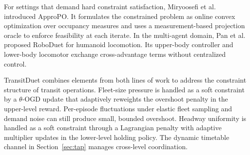 For settings that demand hard constraint satisfaction, Miryoosefi et al.~\citep{miryoosefi2019reinforcement} introduced ApproPO. It formulates the constrained problem as online convex optimization over occupancy measures and uses a measurement-based projection oracle to enforce feasibility at each iterate. In the multi-agent domain, Pan et al.~\citep{pan2024roboduet} proposed RoboDuet for humanoid locomotion. Its upper-body controller and lower-body locomotor exchange cross-advantage terms without centralized control.

TransitDuet combines elements from both lines of work to address the constraint structure of transit operations. Fleet-size pressure is handled as a soft constraint by a $\theta$-OGD update that adaptively reweights the overshoot penalty in the upper-level reward. Per-episode fluctuations under elastic fleet sampling and demand noise can still produce small, bounded overshoot. Headway uniformity is handled as a soft constraint through a Lagrangian penalty with adaptive multiplier updates in the lower-level holding policy. The dynamic timetable channel in Section~\ref{sec:tap} manages cross-level coordination.
